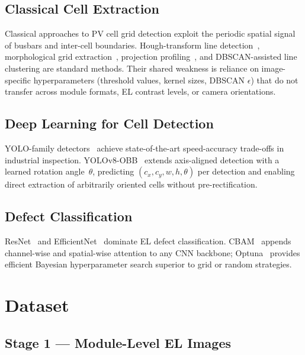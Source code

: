 \documentclass[conference]{IEEEtran}
\begin{document}
\subsection{Classical Cell Extraction}
Classical approaches to PV cell grid detection exploit the
periodic spatial signal of busbars and inter-cell boundaries.
Hough-transform line detection~\cite{duda1972}, morphological
grid extraction~\cite{soille2003}, projection
profiling~\cite{wong1982}, and DBSCAN-assisted line clustering
are standard methods. Their shared weakness is reliance on
image-specific hyperparameters (threshold values, kernel
sizes, DBSCAN $\epsilon$) that do not transfer across module
formats, EL contrast levels, or camera orientations.

\subsection{Deep Learning for Cell Detection}
YOLO-family detectors~\cite{redmon2016,jocher2023} achieve
state-of-the-art speed-accuracy trade-offs in industrial
inspection. YOLOv8-OBB~\cite{jocher2023} extends axis-aligned
detection with a learned rotation angle~$\theta$, predicting
$(c_x, c_y, w, h, \theta)$ per detection and enabling
direct extraction of arbitrarily oriented cells without
pre-rectification.

\subsection{Defect Classification}
ResNet~\cite{he2016} and EfficientNet~\cite{tan2019} dominate
EL defect classification. CBAM~\cite{woo2018} appends
channel-wise and spatial-wise attention to any CNN backbone;
Optuna~\cite{akiba2019} provides efficient Bayesian
hyperparameter search superior to grid or random strategies.

\section{Dataset}
\label{sec:dataset}

\subsection{Stage 1 --- Module-Level EL Images}
\end{document}
